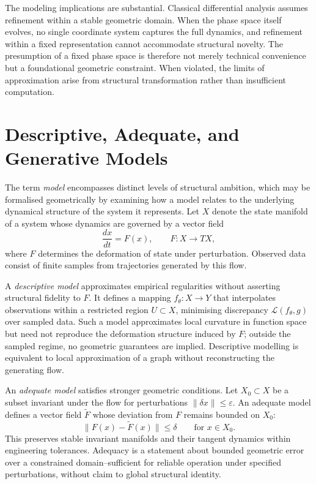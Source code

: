 \documentclass[12pt]{book}
\begin{document}
The modeling implications are substantial. Classical differential analysis
assumes refinement within a stable geometric domain. When the phase space
itself evolves, no single coordinate system captures the full dynamics, and
refinement within a fixed representation cannot accommodate structural novelty.
The presumption of a fixed phase space is therefore not merely technical
convenience but a foundational geometric constraint. When violated, the limits
of approximation arise from structural transformation rather than insufficient
computation.

\section{Descriptive, Adequate, and Generative Models}

The term \emph{model} encompasses distinct levels of structural ambition,
which may be formalised geometrically by examining how a model relates to the
underlying dynamical structure of the system it represents. Let $X$ denote the
state manifold of a system whose dynamics are governed by a vector field
\[
  \frac{dx}{dt} = F(x), \qquad F : X \to TX,
\]
where $F$ determines the deformation of state under perturbation. Observed
data consist of finite samples from trajectories generated by this flow.

A \emph{descriptive model} approximates empirical regularities without
asserting structural fidelity to $F$. It defines a mapping $f_\theta : X \to Y$
that interpolates observations within a restricted region $U \subset X$,
minimising discrepancy $\mathcal{L}(f_\theta, g)$ over sampled data. Such a
model approximates local curvature in function space but need not reproduce the
deformation structure induced by $F$; outside the sampled regime, no geometric
guarantees are implied. Descriptive modelling is equivalent to local
approximation of a graph without reconstructing the generating flow.

An \emph{adequate model} satisfies stronger geometric conditions. Let $X_0
\subset X$ be a subset invariant under the flow for perturbations $\|\delta
x\| \le \varepsilon$. An adequate model defines a vector field $\tilde{F}$
whose deviation from $F$ remains bounded on $X_0$:
\[
  \|F(x) - \tilde{F}(x)\| \le \delta \qquad \text{for } x \in X_0.
\]
This preserves stable invariant manifolds and their tangent dynamics within
engineering tolerances. Adequacy is a statement about bounded geometric error
over a constrained domain--sufficient for reliable operation under specified
perturbations, without claim to global structural identity.
\end{document}

